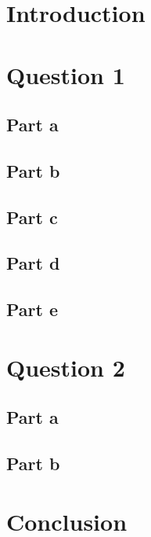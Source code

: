 \documentclass[a4paper 12pt]{article}
\begin{document}
\hypersetup{pageanchor=false}

\hypersetup{pageanchor=true}


\tableofcontents
\clearpage
\section{Introduction}

\section{Question 1}

\subsection{Part a}

\subsection{Part b}

\subsection{Part c}

\subsection{Part d}

\subsection{Part e}

\section{Question 2}

\subsection{Part a}

\subsection{Part b}

\section{Conclusion}

\clearpage
\printbibliography
\end{document}
